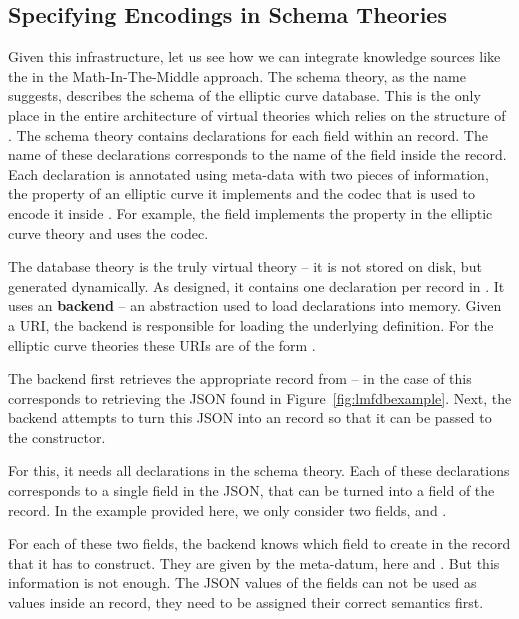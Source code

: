 \subsection{Specifying Encodings in Schema Theories}

Given this infrastructure, let us see how we can integrate knowledge sources like the \lmfdb in the Math-In-The-Middle approach. 
The schema theory, as the name suggests, describes the schema of the \lmfdb elliptic curve database. 
This is the only place in the entire architecture of virtual theories which relies on the structure of \lmfdb. 
The schema theory contains declarations for each field within an \lmfdb record. 
The name of these declarations corresponds to the name of the field inside the record. 
Each declaration is annotated using \mmt meta-data with two pieces of information, the property of an elliptic curve it implements and the codec that is used to encode it inside \lmfdb. 
For example, the  field implements the  property in the elliptic curve theory and uses the  codec.

The database theory is the truly virtual theory -- it is not stored on disk, but generated dynamically. 
As designed, it contains one declaration per record in \lmfdb. 
It uses an \mmt \textbf{backend} -- an \mmt abstraction used to load declarations into memory. 
Given a URI, the backend is responsible for loading the underlying definition. 
For the elliptic curve theories these URIs are of the form . 

The backend first retrieves the appropriate record from {\lmfdb} -- in the case of  this corresponds to retrieving the JSON found in Figure~\ref{fig:lmfdbexample}. 
Next, the backend attempts to turn this JSON into an \mmt record so that it can be passed to the  constructor.

For this, it needs all declarations in the schema theory. 
Each of these declarations corresponds to a single field in the JSON, that can be turned into a field of the \mmt record. 
In the example provided here, we only consider two fields,  and .

For each of these two fields, the backend knows which field to create in the \mmt record that it has to construct. 
They are given by the  meta-datum, here  and . 
But this information is not enough. 
The JSON values of the fields can not be used as values inside an \mmt record, they need to be assigned their correct semantics first.

